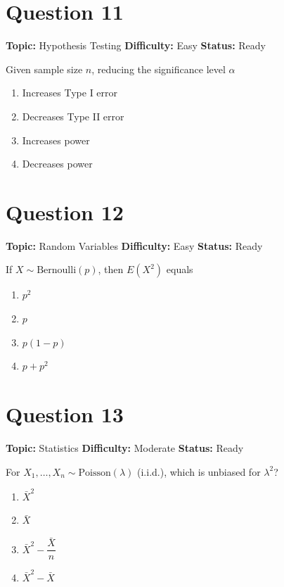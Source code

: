 \documentclass[11pt]{article}
\begin{document}
\newpage

\section*{Question 11}


\noindent\textbf{Topic:} Hypothesis Testing \quad \textbf{Difficulty:} Easy \quad \textbf{Status:} Ready



Given sample size $n$, reducing the significance level $\alpha$
\begin{enumerate}[label=(\Alph*)]
\item Increases Type I error
\item Decreases Type II error
\item Increases power
\item Decreases power
\end{enumerate}

\newpage

\section*{Question 12}


\noindent\textbf{Topic:} Random Variables \quad \textbf{Difficulty:} Easy \quad \textbf{Status:} Ready



If $X \sim \text{Bernoulli}(p)$, then $E(X^2)$ equals
\begin{enumerate}[label=(\Alph*)]
\item $p^2$ \item $p$ \item $p(1-p)$ \item $p + p^2$
\end{enumerate}

\newpage

\section*{Question 13}


\noindent\textbf{Topic:} Statistics \quad \textbf{Difficulty:} Moderate \quad \textbf{Status:} Ready



For $X_1, \dots, X_n \sim \text{Poisson}(\lambda)$ (i.i.d.), which is unbiased for $\lambda^2$?
\begin{enumerate}[label=(\Alph*)]
\item $\bar{X}^2$
\item $\bar{X}$
\item $\bar{X}^2 - \dfrac{\bar{X}}{n}$
\item $\bar{X}^2 - \bar{X}$
\end{enumerate}
\end{document}
